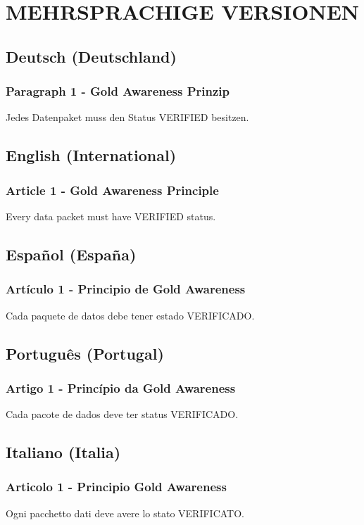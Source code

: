 \documentclass[11pt,a4paper]{report}
\begin{document}
\chapter{MEHRSPRACHIGE VERSIONEN}

\section{Deutsch (Deutschland)}
\subsection{Paragraph 1 - Gold Awareness Prinzip}
Jedes Datenpaket muss den Status VERIFIED besitzen.

\section{English (International)}
\subsection{Article 1 - Gold Awareness Principle}
Every data packet must have VERIFIED status.

\section{Español (España)}
\subsection{Artículo 1 - Principio de Gold Awareness}
Cada paquete de datos debe tener estado VERIFICADO.

\section{Português (Portugal)}
\subsection{Artigo 1 - Princípio da Gold Awareness}
Cada pacote de dados deve ter status VERIFICADO.

\section{Italiano (Italia)}
\subsection{Articolo 1 - Principio Gold Awareness}
Ogni pacchetto dati deve avere lo stato VERIFICATO.
\end{document}
